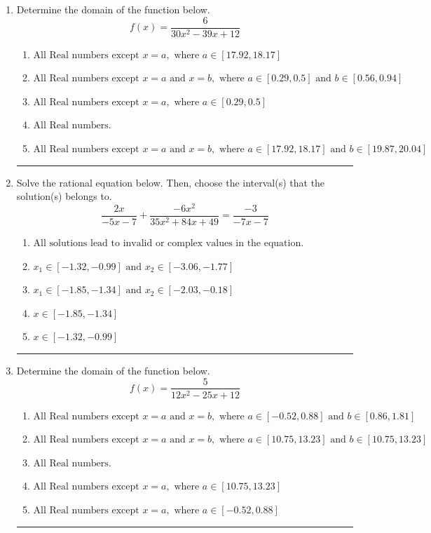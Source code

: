 \documentclass[14pt]{extbook}
\newcommand{\litem}[1]{\item#1\hspace*{-1cm}\rule{\textwidth}{0.4pt}}
\begin{document}
\begin{enumerate}
{\begin{enumerate}[label=\Alph*.]
\end{enumerate} }
\litem{
Determine the domain of the function below.\[ f(x) = \frac{6}{30x^{2} -39 x + 12} \]\begin{enumerate}[label=\Alph*.]
\item \( \text{All Real numbers except } x = a, \text{ where } a \in [17.92, 18.17] \)
\item \( \text{All Real numbers except } x = a \text{ and } x = b, \text{ where } a \in [0.29, 0.5] \text{ and } b \in [0.56, 0.94] \)
\item \( \text{All Real numbers except } x = a, \text{ where } a \in [0.29, 0.5] \)
\item \( \text{All Real numbers.} \)
\item \( \text{All Real numbers except } x = a \text{ and } x = b, \text{ where } a \in [17.92, 18.17] \text{ and } b \in [19.87, 20.04] \)

\end{enumerate} }
\litem{
Solve the rational equation below. Then, choose the interval(s) that the solution(s) belongs to.\[ \frac{2x}{-5x -7} + \frac{-6x^{2}}{35x^{2} +84 x + 49} = \frac{-3}{-7x -7} \]\begin{enumerate}[label=\Alph*.]
\item \( \text{All solutions lead to invalid or complex values in the equation.} \)
\item \( x_1 \in [-1.32, -0.99] \text{ and } x_2 \in [-3.06,-1.77] \)
\item \( x_1 \in [-1.85, -1.34] \text{ and } x_2 \in [-2.03,-0.18] \)
\item \( x \in [-1.85,-1.34] \)
\item \( x \in [-1.32,-0.99] \)

\end{enumerate} }
\litem{
Determine the domain of the function below.\[ f(x) = \frac{5}{12x^{2} -25 x + 12} \]\begin{enumerate}[label=\Alph*.]
\item \( \text{All Real numbers except } x = a \text{ and } x = b, \text{ where } a \in [-0.52, 0.88] \text{ and } b \in [0.86, 1.81] \)
\item \( \text{All Real numbers except } x = a \text{ and } x = b, \text{ where } a \in [10.75, 13.23] \text{ and } b \in [10.75, 13.23] \)
\item \( \text{All Real numbers.} \)
\item \( \text{All Real numbers except } x = a, \text{ where } a \in [10.75, 13.23] \)
\item \( \text{All Real numbers except } x = a, \text{ where } a \in [-0.52, 0.88] \)


\end{enumerate}}
\end{enumerate}
\end{document}
